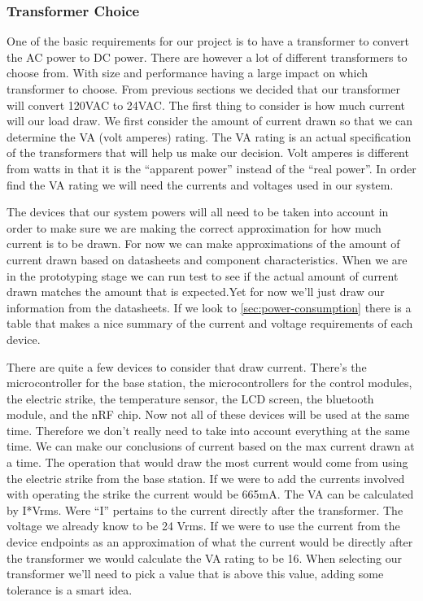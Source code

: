 
\subsubsection{Transformer Choice}
One of the basic requirements for our project is to have a transformer to
convert the AC power to DC power. There are however a lot of different
transformers to choose from. With size and performance having a large impact on
which transformer to choose. From previous sections we decided that our
transformer will convert 120VAC to 24VAC. The first thing to consider is how
much current will our load draw. We first consider the amount of current drawn
so that we can determine the VA (volt amperes) rating. The VA rating is an
actual specification of the transformers that will help us make our decision.
Volt amperes is different from watts in that it is the {}``apparent power{}''
instead of the {}``real power{}''. In order find the VA rating we will need the
currents and voltages used in our system.

The devices that our system powers will all need to be taken
into account in order to make sure we are making the correct approximation
for how much current is to be drawn. For now we can make approximations of
the amount of current drawn based on datasheets and component
characteristics. When we are in the prototyping stage we can run test to see
if the actual amount of current drawn matches the amount that is expected.Yet
for now we{}'ll just draw our information from the datasheets. If we look to
\autoref{sec:power-consumption} there is a table that makes a nice summary of the
current and voltage requirements of each device.

There are quite a few devices to consider that draw current.
There{}'s the microcontroller for the base station, the microcontrollers for
the control modules, the electric strike, the temperature sensor, the LCD
screen, the bluetooth module, and the nRF chip. Now not all of these devices
will be used at the same time. Therefore we don{}'t really need to take into
account everything at the same time. We can make our conclusions of current
based on the max current drawn at a time. The operation that would draw the
most current would come from using the electric strike from the base station.
If we were to add the currents involved with operating the strike the current
would be 665mA. The VA can be calculated by I*Vrms. Were {}``I{}'' pertains
to the current directly after the transformer. The voltage we already know to
be 24 Vrms. If we were to use the current from the device endpoints as an
approximation of what the current would be directly after the transformer we
would calculate the VA rating to be 16. When selecting our transformer we{}'ll
need to pick a value that is above this value, adding some tolerance is a smart
idea.

